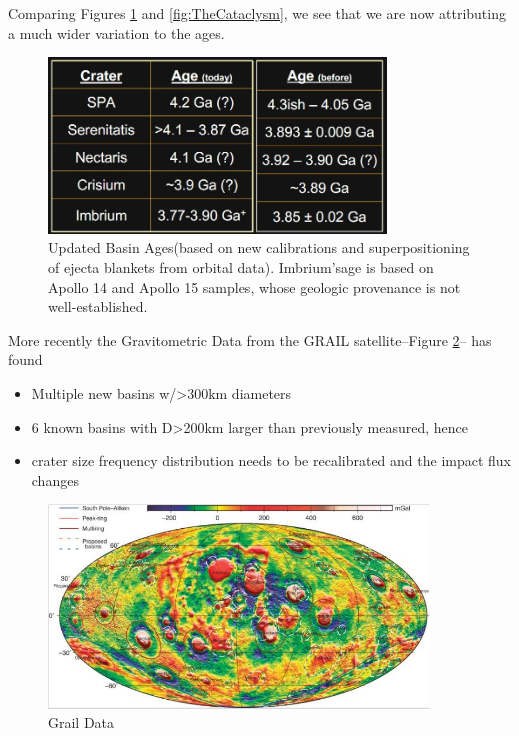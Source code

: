 \documentclass[]{article}
\begin{document}
Comparing Figures \ref{fig:UpdatedBasinAges} and \ref{fig:TheCataclysm}, we see that we are now attributing a much wider variation to the ages.
\begin{figure}[H]
	\begin{center}
		\caption[Updated Basin Ages]{Updated Basin Ages(based on new calibrations and superpositioning of ejecta blankets from orbital data). Imbrium’sage is based on Apollo 14 and Apollo 15 samples, whose geologic provenance is not well-established.}\label{fig:UpdatedBasinAges}
		\includegraphics[width=0.8\textwidth]{UpdatedBasinAges}
	\end{center}
\end{figure}

More recently the Gravitometric Data from the GRAIL satellite--Figure \ref{fig:GrailData}-- has found
\begin{itemize}
	\item Multiple new basins w/>300km diameters
	\item 6 known basins with D>200km larger than previously measured, hence
	\item crater size frequency distribution needs to be recalibrated and the impact flux changes
\end{itemize}

\begin{figure}[H]
	\caption{Grail Data}\label{fig:GrailData}
	\includegraphics[width=0.9\textwidth]{GrailData}
\end{figure}
\end{document}
